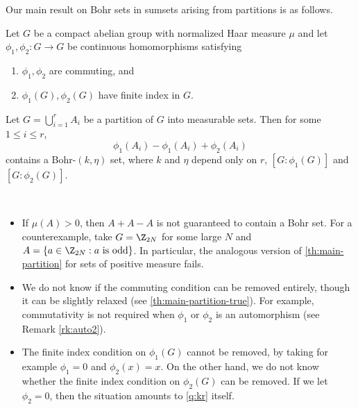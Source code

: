 Our main result on Bohr sets in sumsets arising from partitions is as follows. 


\begin{theorem} \label{th:main-partition}
Let $G$ be a compact abelian group with normalized Haar measure $\mu$ and let $\phi_1, \phi_2: G \rightarrow G$ be continuous homomorphisms satisfying
\begin{enumerate}[label=(\alph*), leftmargin=*]
\item $\phi_1, \phi_2$ are commuting, and
\item $\phi_1(G), \phi_2(G)$ have finite index in $G$.
\end{enumerate} 
Let $G = \bigcup_{i=1}^r A_i$ be a partition of $G$ into measurable sets. Then for some $1 \leq i \leq r$, 
\[
\phi_1(A_i) - \phi_1(A_i) + \phi_2(A_i)
\] 
contains a Bohr-$(k, \eta)$ set, where $k$ and $\eta$ depend only on $r$, $[G:\phi_1(G)]$ and $[G:\phi_2(G)]$.
\end{theorem}
\begin{remark}\label{remark:first_one} \
\begin{itemize}[leftmargin=*]
\item If $\mu(A) >0$, then $A + A - A$ is not guaranteed to contain a Bohr set. For a counterexample, take $G = \Z_{2N}$ for some large $N$ and $A=\{a \in \Z_{2N}: a \textup{ is odd} \}$. In particular, the analogous version of \cref{th:main-partition} for sets of positive measure fails. 

\item We do not know if the commuting condition can be removed entirely, though it can be slightly relaxed (see \cref{th:main-partition-true}). For example, commutativity is not required when $\phi_1$ or $\phi_2$ is an automorphism (see Remark \ref{rk:auto2}).

\item The finite index condition on $\phi_1(G)$ cannot be removed, by taking for example $\phi_1 = 0$ and $\phi_2(x) = x$. On the other hand, we do not know whether the finite index condition on $\phi_2(G)$ can be removed. If we let $\phi_2 = 0$, then the situation amounts to \cref{q:kr} itself. 

\end{itemize}
\end{remark}
